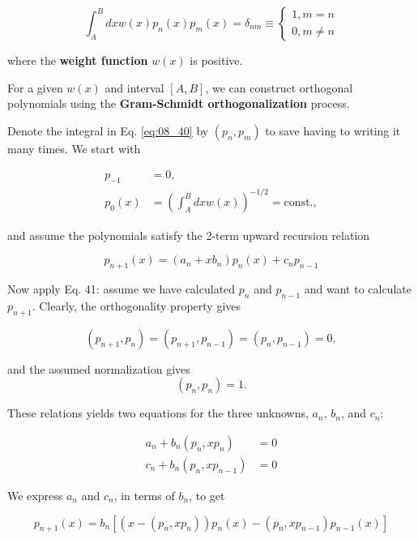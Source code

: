\begin{equation}\label{eq:08_40}
\int_{A}^{B} dx w(x)p_{n}(x)p_{m}(x) = \delta_{nm} \equiv 
    \begin{cases}
        1, m   = n \\
        0, m \ne n 
    \end{cases}
\end{equation}

where the \textbf{weight function} $w(x)$ is positive.

For a given $w(x)$ and interval $[A,B]$, we can construct orthogonal polynomials using the \textbf{Gram-Schmidt orthogonalization} process.

Denote the integral in Eq. \ref{eq:08_40} by $(p_{n}, p_{m})$ to save having to writing it many times. We start with


  \begin{align*}
p_{-1} & = 0, \\
p_{0}(x) & = (\int_{A}^{B}dx w(x))^{-1/2} = \text{const.} ,
  \end{align*}

and assume the polynomials satisfy the 2-term upward recursion relation

\begin{equation}
p_{n+1}(x) = (a_{n} + xb_{n} ) p_{n}(x) + c_{n}p_{n-1}
\end{equation}

Now apply Eq. 41: assume we have calculated $p_{n}$ and $p_{n-1}$ and want to calculate $p_{n+1}$. Clearly, the orthogonality property gives

\begin{equation}
(p_{n+1},p_{n}) = (p_{n+1},p_{n-1}) = (p_{n},p_{n-1}) = 0,
\end{equation}

and the assumed normalization gives
\begin{equation}
(p_{n},p_{n}) = 1.
\end{equation}

These relations yields two equations for the three unknowns, $a_{n}$, $b_{n}$, and $c_{n}$:

\begin{align*}
a_{n} + b_{n} (p_n, xp_{n})   & = 0 \\
c_{n} + b_{n} (p_n, xp_{n-1}) & = 0
\end{align*}

We express $a_{n}$ and $c_{n}$, in terms of $b_{n}$, to get

\begin{equation}
p_{n+1}(x) = b_{n} \left[ (x - (p_{n}, xp_{n})) p_{n}(x) - (p_{n} , x p_{n-1})p_{n-1}(x) \right]
\end{equation}

